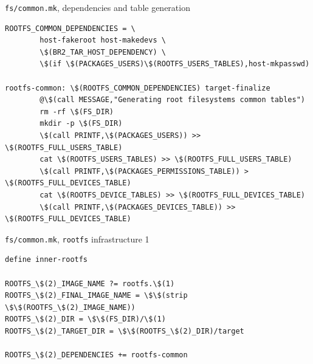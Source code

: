 \begin{frame}[fragile]{{\tt fs/common.mk}, dependencies and table generation}
  \begin{block}{}
\begin{verbatim}
ROOTFS_COMMON_DEPENDENCIES = \
        host-fakeroot host-makedevs \
        \$(BR2_TAR_HOST_DEPENDENCY) \
        \$(if \$(PACKAGES_USERS)\$(ROOTFS_USERS_TABLES),host-mkpasswd)

rootfs-common: \$(ROOTFS_COMMON_DEPENDENCIES) target-finalize
        @\$(call MESSAGE,"Generating root filesystems common tables")
        rm -rf \$(FS_DIR)
        mkdir -p \$(FS_DIR)
        \$(call PRINTF,\$(PACKAGES_USERS)) >> \$(ROOTFS_FULL_USERS_TABLE)
        cat \$(ROOTFS_USERS_TABLES) >> \$(ROOTFS_FULL_USERS_TABLE)
        \$(call PRINTF,\$(PACKAGES_PERMISSIONS_TABLE)) > \$(ROOTFS_FULL_DEVICES_TABLE)
        cat \$(ROOTFS_DEVICE_TABLES) >> \$(ROOTFS_FULL_DEVICES_TABLE)
        \$(call PRINTF,\$(PACKAGES_DEVICES_TABLE)) >> \$(ROOTFS_FULL_DEVICES_TABLE)
\end{verbatim}
  \end{block}
\end{frame}

\begin{frame}[fragile]{{\tt fs/common.mk}, {\tt rootfs} infrastructure 1}
  \begin{block}{}
\begin{verbatim}
define inner-rootfs

ROOTFS_\$(2)_IMAGE_NAME ?= rootfs.\$(1)
ROOTFS_\$(2)_FINAL_IMAGE_NAME = \$\$(strip \$\$(ROOTFS_\$(2)_IMAGE_NAME))
ROOTFS_\$(2)_DIR = \$\$(FS_DIR)/\$(1)
ROOTFS_\$(2)_TARGET_DIR = \$\$(ROOTFS_\$(2)_DIR)/target

ROOTFS_\$(2)_DEPENDENCIES += rootfs-common
\end{verbatim}
  \end{block}
\end{frame}

